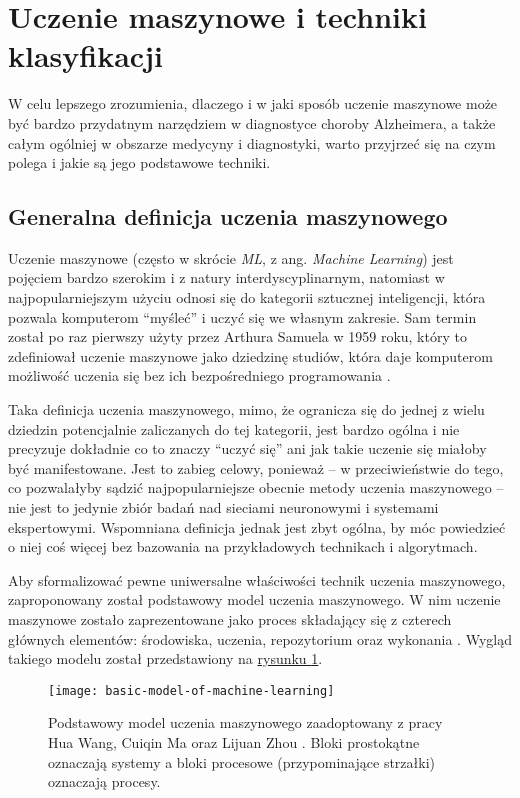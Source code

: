 \section{Uczenie maszynowe i techniki klasyfikacji}

W celu lepszego zrozumienia, dlaczego i w jaki sposób uczenie maszynowe może być bardzo przydatnym narzędziem w diagnostyce choroby Alzheimera, a także całym ogólniej w obszarze medycyny i diagnostyki, warto przyjrzeć się na czym polega i jakie są jego podstawowe techniki.

\subsection{Generalna definicja uczenia maszynowego}

Uczenie maszynowe (często w skrócie \emph{ML}, z ang. \emph{Machine Learning}) jest pojęciem bardzo szerokim i z natury interdyscyplinarnym, natomiast w najpopularniejszym użyciu odnosi się do kategorii sztucznej inteligencji, która pozwala komputerom ``myśleć'' i uczyć się we własnym zakresie.
Sam termin został po raz pierwszy użyty przez Arthura Samuela w 1959 roku, który to zdefiniował uczenie maszynowe jako dziedzinę studiów, która daje komputerom możliwość uczenia się bez ich bezpośredniego programowania \cite{samuel1959some}.

Taka definicja uczenia maszynowego, mimo, że ogranicza się do jednej z wielu dziedzin potencjalnie zaliczanych do tej kategorii, jest bardzo ogólna i nie precyzuje dokładnie co to znaczy ``uczyć się'' ani jak takie uczenie się miałoby być manifestowane.
Jest to zabieg celowy, ponieważ -- w przeciwieństwie do tego, co pozwalałyby sądzić najpopularniejsze obecnie metody uczenia maszynowego -- nie jest to jedynie zbiór badań nad sieciami neuronowymi i systemami ekspertowymi.
Wspomniana definicja jednak jest zbyt ogólna, by móc powiedzieć o niej coś więcej bez bazowania na przykładowych technikach i algorytmach.

Aby sformalizować pewne uniwersalne właściwości technik uczenia maszynowego, zaproponowany został podstawowy model uczenia maszynowego.
W nim uczenie maszynowe zostało zaprezentowane jako proces składający się z czterech głównych elementów: środowiska, uczenia, repozytorium oraz wykonania \cite{wang2009brief}.
Wygląd takiego modelu został przedstawiony na \hyperref[fig:basic-model-of-machine-learning]{rysunku \ref*{fig:basic-model-of-machine-learning}}.

\begin{figure}[ht]
  \texttt{[image: basic-model-of-machine-learning]}
  \caption[Podstawowy model uczenia maszynowego]{Podstawowy model uczenia maszynowego zaadoptowany z pracy Hua Wang, Cuiqin Ma oraz Lijuan Zhou \cite{wang2009brief}. Bloki prostokątne oznaczają systemy a bloki procesowe (przypominające strzałki) oznaczają procesy.}
  \label{fig:basic-model-of-machine-learning}
\end{figure}

